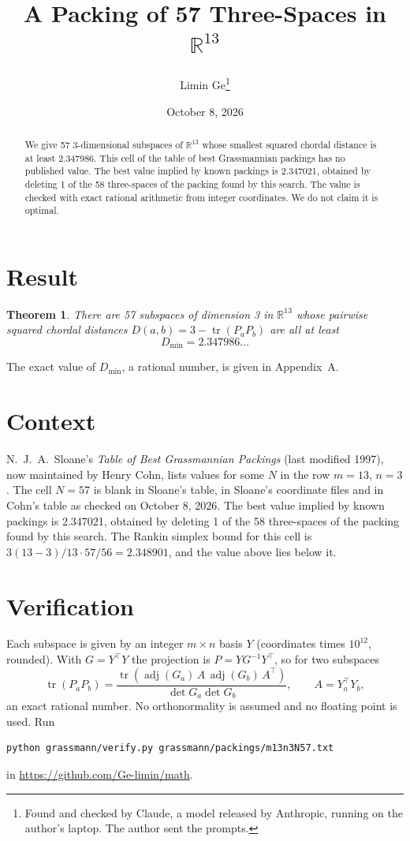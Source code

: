 \documentclass[11pt,a4paper]{article}
\title{A Packing of 57 Three-Spaces in $\mathbb{R}^{13}$}
\author{Limin Ge\thanks{Found and checked by Claude, a model released by Anthropic, running on the author's laptop. The author sent the prompts.}}
\date{October 8, 2026}
\newtheorem*{theorem}{Theorem}
\begin{document}
\maketitle
\begin{abstract}
We give 57 3-dimensional subspaces of $\mathbb{R}^{13}$ whose smallest squared chordal distance is at least 2.347986. This cell of the table of best Grassmannian packings has no published value. The best value implied by known packings is 2.347021, obtained by deleting 1 of the 58 three-spaces of the packing found by this search. The value is checked with exact rational arithmetic from integer coordinates. We do not claim it is optimal.
\end{abstract}

\section{Result}
\begin{theorem}
There are 57 subspaces of dimension 3 in $\mathbb{R}^{13}$ whose pairwise squared chordal distances $D(a,b) = 3 - \operatorname{tr}(P_aP_b)$ are all at least
\[ D_{\min} = 2.347986\ldots \]
\end{theorem}
The exact value of $D_{\min}$, a rational number, is given in Appendix~A.


\section{Context}
N.~J.~A.~Sloane's \emph{Table of Best Grassmannian Packings} (last modified 1997), now maintained by Henry Cohn, lists values for some $N$ in the row $m=13$, $n=3$. The cell $N=57$ is blank in Sloane's table, in Sloane's coordinate files and in Cohn's table as checked on October 8, 2026. The best value implied by known packings is 2.347021, obtained by deleting 1 of the 58 three-spaces of the packing found by this search. The Rankin simplex bound for this cell is $3(13-3)/13\cdot 57/56 = 2.348901$, and the value above lies below it.


\section{Verification}
Each subspace is given by an integer $m\times n$ basis $Y$ (coordinates times $10^{12}$, rounded). With $G=Y^\top Y$ the projection is $P=YG^{-1}Y^\top$, so for two subspaces
\[ \operatorname{tr}(P_aP_b)=\frac{\operatorname{tr}(\operatorname{adj}(G_a)\,A\,\operatorname{adj}(G_b)\,A^\top)}{\det G_a\det G_b},\qquad A=Y_a^\top Y_b, \]
an exact rational number. No orthonormality is assumed and no floating point is used. Run
\begin{verbatim}
python grassmann/verify.py grassmann/packings/m13n3N57.txt
\end{verbatim}
in \url{https://github.com/Ge-limin/math}.
\end{document}
